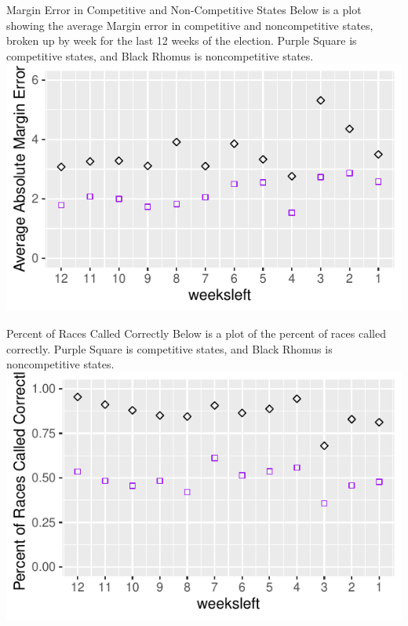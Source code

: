 \documentclass{beamer}\usepackage[]{graphicx}\usepackage[]{color}
\makeatletter
\def\maxwidth{ %
  \ifdim\Gin@nat@width>\linewidth
    \linewidth
  \else
    \Gin@nat@width
  \fi
}
\newenvironment{knitrout}{}{} %
\makeatother
\begin{document}
\begin{frame}{Margin Error in Competitive and Non-Competitive States}
Below is a plot showing the average Margin error in competitive and noncompetitive states, broken up by week for the last 12 weeks of the election. Purple Square is competitive states, and Black Rhomus is noncompetitive states.
\begin{knitrout}
\color{fgcolor}
\includegraphics[width=\maxwidth]{figure/unnamed-chunk-4-1} 

\end{knitrout}

\end{frame}
\begin{frame}{Percent of Races Called Correctly}
Below is a plot of the percent of races called correctly. Purple Square is competitive states, and Black Rhomus is noncompetitive states.
\begin{knitrout}
\color{fgcolor}
\includegraphics[width=\maxwidth]{figure/unnamed-chunk-5-1} 

\end{knitrout}
\end{frame}
\end{document}
